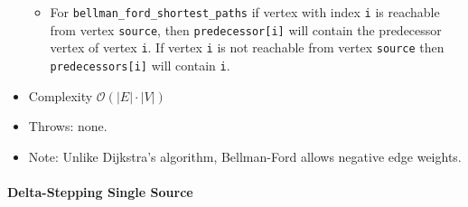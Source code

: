 \begin{itemize}
\begin{itemize}
\item[]
For \lstinline{bellman_ford_shortest_paths} if vertex with index \lstinline{i} is reachable
from vertex \lstinline{source}, then \lstinline{predecessor[i]} will contain the
predecessor vertex of vertex \lstinline{i}.  If vertex \lstinline{i} is not reachable
from vertex \lstinline{source} then \lstinline{predecessors[i]} will contain
\lstinline{i}.
\end{itemize}
%
\item[] Complexity $\mathcal{O}(|E| \cdot |V|)$ 
\item[] Throws: none. 
\item[] Note:  Unlike Dijkstra's algorithm, Bellman-Ford allows negative edge weights.
\end{itemize}


\paragraph{Delta-Stepping Single Source}

{\small

}



